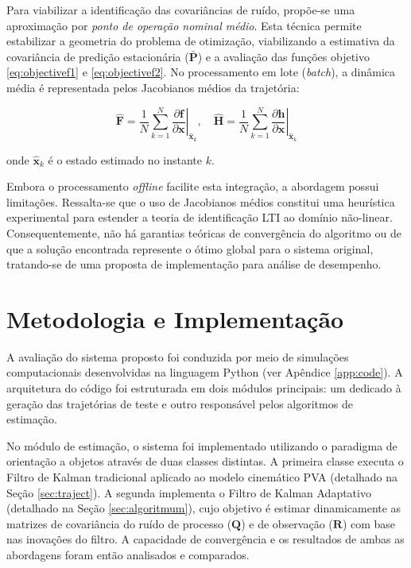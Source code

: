 \documentclass[journal]{IEEEtran}
\begin{document}
Para viabilizar a identificação das covariâncias de ruído, propõe-se uma aproximação por \textit{ponto de operação nominal médio}. Esta técnica permite estabilizar a geometria do problema de otimização, viabilizando a estimativa da covariância de predição estacionária ($\bar{\mathbf{P}}$) e a avaliação das funções objetivo \eqref{eq:objectivef1} e \eqref{eq:objectivef2}. No processamento em lote (\textit{batch}), a dinâmica média é representada pelos Jacobianos médios da trajetória:

\begin{equation}
\hat{\mathbf{F}} = \frac{1}{N} \sum_{k=1}^{N} \left. \frac{\partial \mathbf{f}}{\partial \mathbf{x}} \right|_{\hat{\mathbf{x}}_k}, \quad \hat{\mathbf{H}} = \frac{1}{N} \sum_{k=1}^{N} \left. \frac{\partial \mathbf{h}}{\partial \mathbf{x}} \right|_{\hat{\mathbf{x}}_k}
\label{eq:jacobianos_medios}
\end{equation}

onde $\hat{\mathbf{x}}_k$ é o estado estimado no instante $k$. 

Embora o processamento \textit{offline} facilite esta integração, a abordagem possui limitações. Ressalta-se que o uso de Jacobianos médios constitui uma heurística experimental para estender a teoria de identificação LTI ao domínio não-linear. Consequentemente, não há garantias teóricas de convergência do algoritmo ou de que a solução encontrada represente o ótimo global para o sistema original, tratando-se de uma proposta de implementação para análise de desempenho. 

\section{Metodologia e Implementação}
\label{sec:metodologia}
A avaliação do sistema proposto foi conduzida por meio de simulações computacionais desenvolvidas na linguagem Python (ver Apêndice \ref{app:code}). A arquitetura do código foi estruturada em dois módulos principais: um dedicado à geração das trajetórias de teste e outro responsável pelos algoritmos de estimação.

No módulo de estimação, o sistema foi implementado utilizando o paradigma de orientação a objetos através de duas classes distintas. A primeira classe executa o Filtro de Kalman tradicional aplicado ao modelo cinemático PVA (detalhado na Seção \ref{sec:traject}). A segunda implementa o Filtro de Kalman Adaptativo (detalhado na Seção \ref{sec:algoritmum}), cujo objetivo é estimar dinamicamente as matrizes de covariância do ruído de processo ($\mathbf{Q}$) e de observação ($\mathbf{R}$) com base nas inovações do filtro. A capacidade de convergência e os resultados de ambas as abordagens foram então analisados e comparados.
\end{document}
